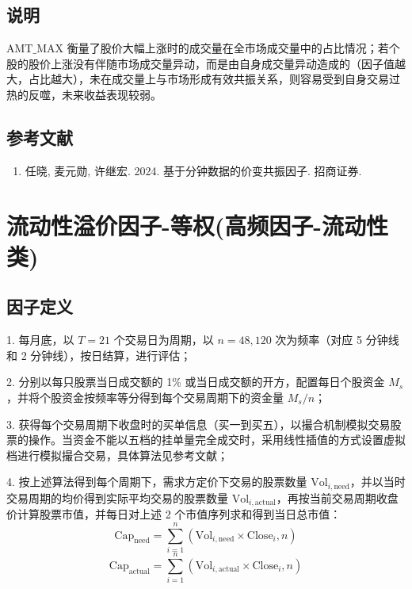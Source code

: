 \documentclass{article}
\begin{document}
\subsection{说明}
\( \mathrm{AMT\_MAX} \) 衡量了股价大幅上涨时的成交量在全市场成交量中的占比情况；若个股的股价上涨没有伴随市场成交量异动，而是由自身成交量异动造成的（因子值越大，占比越大），未在成交量上与市场形成有效共振关系，则容易受到自身交易过热的反噬，未来收益表现较弱。

\subsection{参考文献}
\begin{enumerate}
    \item 任晓, 麦元勋, 许继宏. 2024. 基于分钟数据的价变共振因子. 招商证券.
\end{enumerate}

\section{流动性溢价因子-等权(高频因子-流动性类)}

\subsection{因子定义}

1. 每月底，以 \( T=21 \) 个交易日为周期，以 \( n=48,120 \) 次为频率（对应 5 分钟线和 2 分钟线），按日结算，进行评估；

2. 分别以每只股票当日成交额的 1\% 或当日成交额的开方，配置每日个股资金 \( M_s \)，并将个股资金按频率等分得到每个交易周期下的资金量 \( M_s/n \)；

3. 获得每个交易周期下收盘时的买单信息（买一到买五），以撮合机制模拟交易股票的操作。当资金不能以五档的挂单量完全成交时，采用线性插值的方式设置虚拟档进行模拟撮合交易，具体算法见参考文献；

4. 按上述算法得到每个周期下，需求方定价下交易的股票数量 \( \mathrm{Vol}_{i,\mathrm{need}} \)，并以当时交易周期的均价得到实际平均交易的股票数量 \( \mathrm{Vol}_{i,\mathrm{actual}} \)，再按当前交易周期收盘价计算股票市值，并每日对上述 2 个市值序列求和得到当日总市值：
\begin{equation}
    \mathrm{Cap}_{\mathrm{need}} = \sum_{i=1}^{n} (\mathrm{Vol}_{i,\mathrm{need}} \times \mathrm{Close}_{i},n)
\end{equation}
\begin{equation}
    \mathrm{Cap}_{\mathrm{actual}} = \sum_{i=1}^{n} (\mathrm{Vol}_{i,\mathrm{actual}} \times \mathrm{Close}_i,n)
\end{equation}
\end{document}
